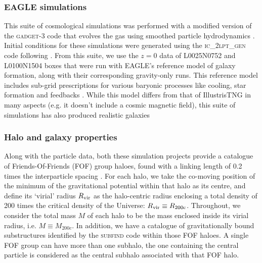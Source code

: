 \subsubsection{EAGLE simulations}
This suite of cosmological simulations was performed with a modified version of the \textsc{gadget-3} code that evolves the gas using smoothed particle hydrodynamics \citep[][]{2005MNRAS.364.1105S}. Initial conditions for these simulations were generated using the \textsc{ic\_2lpt\_gen} code following \cite{2010MNRAS.403.1859J}. 
From this suite, we use the $z=0$ data of L0025N0752 and L0100N1504 boxes that were run with EAGLE's reference model of galaxy formation, along with their corresponding gravity-only runs. This reference model includes sub-grid prescriptions for various baryonic processes like cooling, star formation and feedbacks  \citep[see][for more details]{2015MNRAS.446..521S,2015MNRAS.450.1937C}. While this model differs from that of IllustrisTNG in many aspects (e.g. it doesn't include a cosmic magnetic field), this suite of simulations has also produced realistic galaxies \citep[see e.g.][]{2015MNRAS.448.2941S,2015MNRAS.450.4486F,2015MNRAS.452.2879T}






\subsubsection{Halo and galaxy properties}
\label{sec:halo-props-ch:z0main}
Along with the particle data, 
both these simulation projects provide a catalogue of Friends-Of-Friends (FOF) group haloes, found with a linking length of 0.2 times the interparticle spacing \citep[see][for specifics]{2016A&C....15...72M,2019ComAC...6....2N}.
For each halo, we take the co-moving position of the minimum of the gravitational potential within that halo as its centre, 
and define its `virial' radius $R_{\rm vir}$ as the halo-centric radius enclosing a total density of 200 times the critical density of the Universe:  $R_{\rm vir}\equiv R_{\rm 200c}$. Throughout, we consider the total mass $M$ of each halo to be the mass enclosed inside its virial radius, i.e. $M\equiv M_{200c}$. 
In addition, we have a catalogue of gravitationally bound substructures identified by the \textsc{subfind} code \citep{2001MNRAS.328..726S} within those FOF haloes. 
A single FOF group can have more than one subhalo, the one containing the central particle is considered as the central subhalo associated with that FOF halo.

